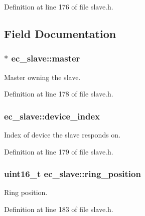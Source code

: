 \-Definition at line 176 of file slave.\-h.



\subsection{\-Field \-Documentation}
\subsubsection[{master}]{$\ast$ {\bf ec\-\_\-slave\-::master}}\label{structec__slave_ae3ca485627d212610814bf4e0130eddd}


\-Master owning the slave. 



\-Definition at line 178 of file slave.\-h.

\subsubsection[{device\-\_\-index}]{ {\bf ec\-\_\-slave\-::device\-\_\-index}}\label{structec__slave_adc17b41384e235c98b39f4ac49319d68}


\-Index of device the slave responds on. 



\-Definition at line 179 of file slave.\-h.

\subsubsection[{ring\-\_\-position}]{\setlength{\rightskip}{0pt plus 5cm}uint16\-\_\-t {\bf ec\-\_\-slave\-::ring\-\_\-position}}\label{structec__slave_a337a538c53fb9ac8bcfb951fd445e0a1}


\-Ring position. 



\-Definition at line 183 of file slave.\-h.

